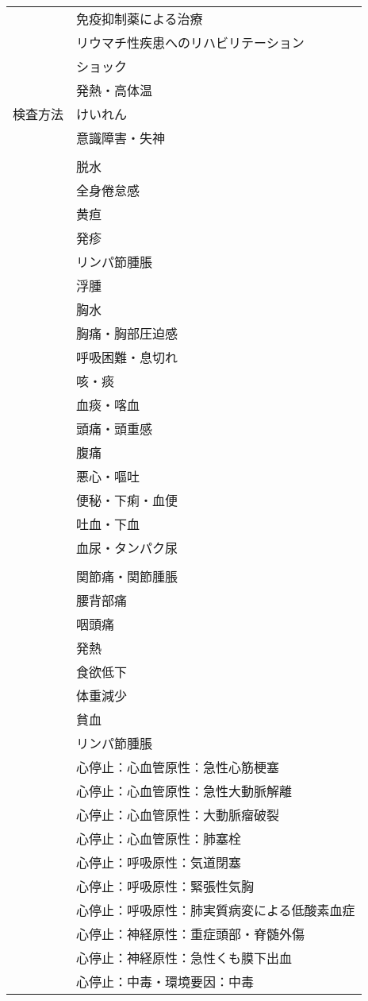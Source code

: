 \begin{xltabular}{\linewidth}{XX}
 & 免疫抑制薬による治療 \\
 & リウマチ性疾患へのリハビリテーション \\
 & ショック \\
 & 発熱・高体温 \\
検査方法 & けいれん \\
 & 意識障害・失神 \\
 &  \\
 & 脱水 \\
 & 全身倦怠感 \\
 & 黄疸 \\
 & 発疹 \\
 & リンパ節腫脹 \\
 & 浮腫 \\
 & 胸水 \\
 & 胸痛・胸部圧迫感 \\
 & 呼吸困難・息切れ \\
 & 咳・痰 \\
 & 血痰・喀血 \\
 & 頭痛・頭重感 \\
 & 腹痛 \\
 & 悪心・嘔吐 \\
 & 便秘・下痢・血便 \\
 & 吐血・下血 \\
 & 血尿・タンパク尿 \\
 &  \\
 & 関節痛・関節腫脹 \\
 & 腰背部痛 \\
 & 咽頭痛 \\
 & 発熱 \\
 & 食欲低下 \\
 & 体重減少 \\
 & 貧血 \\
 & リンパ節腫脹 \\
 & 心停止：心血管原性：急性心筋梗塞 \\
 & 心停止：心血管原性：急性大動脈解離 \\
 & 心停止：心血管原性：大動脈瘤破裂 \\
 & 心停止：心血管原性：肺塞栓 \\
 & 心停止：呼吸原性：気道閉塞 \\
 & 心停止：呼吸原性：緊張性気胸 \\
 & 心停止：呼吸原性：肺実質病変による低酸素血症 \\
 & 心停止：神経原性：重症頭部・脊髄外傷 \\
 & 心停止：神経原性：急性くも膜下出血 \\
 & 心停止：中毒・環境要因：中毒 \\

\end{xltabular}
